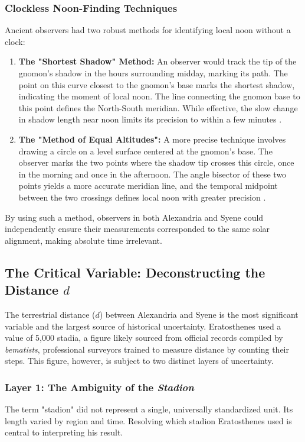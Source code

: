 \documentclass[11pt]{article}
\begin{document}
\subsubsection{Clockless Noon-Finding Techniques}
Ancient observers had two robust methods for identifying local noon without a clock:
\begin{enumerate}
    \item  \textbf{The "Shortest Shadow" Method:} An observer would track the tip of the gnomon's shadow in the hours surrounding midday, marking its path. The point on this curve closest to the gnomon's base marks the shortest shadow, indicating the moment of local noon. The line connecting the gnomon base to this point defines the North-South meridian. While effective, the slow change in shadow length near noon limits its precision to within a few minutes \cite{Goldstein1983}.
    \item  \textbf{The "Method of Equal Altitudes":} A more precise technique involves drawing a circle on a level surface centered at the gnomon's base. The observer marks the two points where the shadow tip crosses this circle, once in the morning and once in the afternoon. The angle bisector of these two points yields a more accurate meridian line, and the temporal midpoint between the two crossings defines local noon with greater precision \cite{Neugebauer1975}.
\end{enumerate}

By using such a method, observers in both Alexandria and Syene could independently ensure their measurements corresponded to the same solar alignment, making absolute time irrelevant.

\subsection{The Critical Variable: Deconstructing the Distance \texorpdfstring{$d$}{d}}

The terrestrial distance ($d$) between Alexandria and Syene is the most significant variable and the largest source of historical uncertainty. Eratosthenes used a value of 5,000 stadia, a figure likely sourced from official records compiled by \textit{bematists}, professional surveyors trained to measure distance by counting their steps. This figure, however, is subject to two distinct layers of uncertainty.

\subsubsection{Layer 1: The Ambiguity of the \textit{Stadion}}
The term "stadion" did not represent a single, universally standardized unit. Its length varied by region and time. Resolving which stadion Eratosthenes used is central to interpreting his result.
\end{document}
